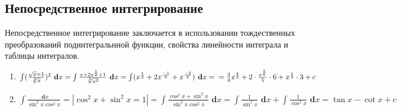 \documentclass[a4paper,12pt]{bookest}
\theoremstyle{remark}
\newcommand\dx{\textbf{ d}x}
\begin{document}
\subsection{Непосредственное интегрирование}
Непосредственное интегрирование заключается в использовании тождественных преобразований подинтегральнной функции, свойства линейности интеграла и таблицы интегралов.\\
\begin{example}
\begin{enumerate}
	\item $\int(\frac{\sqrt{x}+1}{\sqrt[3]{x}})^2\dx=\int\frac{x+2x^{\frac{1}{2}}+1}{\sqrt[3]{x^2}}\dx=\int(x^{\frac{1}{3}}+2x^{\frac{-1}{6}}+x^{\frac{-2}{3}})\dx=\\=\frac{3}{4}x^{\frac{4}{3}}+2\cdot\frac{x^{\frac{5}{6}}}{5}\cdot 6+x^{\frac{1}{3}}\cdot 3+c$
	\item $\int\frac{\dx}{\sin^2x\cos^2x}=|\cos^2x+\sin^2x=1|=\int\frac{\cos^2x+\sin^2x}{\sin^2x\cos^2x}\dx=\int\frac{1}{\sin^2x}\dx+\int\frac{1}{\cos^2x}\dx=\tan x-\cot x+c$
\end{enumerate}
\end{example}
\end{document}
